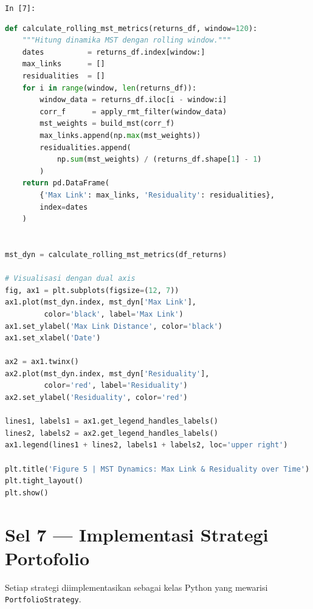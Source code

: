 \documentclass[12pt,a4paper]{article}
\newcommand{\cellIn}[1]{%
  \begin{tcolorbox}[cellheader]
    \texttt{In [#1]:}
  \end{tcolorbox}\vspace{-6pt}%
}
\begin{document}
\cellIn{7}
\begin{tcolorbox}[codebox]
\begin{lstlisting}[language=Python, numbers=none]
def calculate_rolling_mst_metrics(returns_df, window=120):
    """Hitung dinamika MST dengan rolling window."""
    dates          = returns_df.index[window:]
    max_links      = []
    residualities  = []
    for i in range(window, len(returns_df)):
        window_data = returns_df.iloc[i - window:i]
        corr_f      = apply_rmt_filter(window_data)
        mst_weights = build_mst(corr_f)
        max_links.append(np.max(mst_weights))
        residualities.append(
            np.sum(mst_weights) / (returns_df.shape[1] - 1)
        )
    return pd.DataFrame(
        {'Max Link': max_links, 'Residuality': residualities},
        index=dates
    )


mst_dyn = calculate_rolling_mst_metrics(df_returns)

# Visualisasi dengan dual axis
fig, ax1 = plt.subplots(figsize=(12, 7))
ax1.plot(mst_dyn.index, mst_dyn['Max Link'],
         color='black', label='Max Link')
ax1.set_ylabel('Max Link Distance', color='black')
ax1.set_xlabel('Date')

ax2 = ax1.twinx()
ax2.plot(mst_dyn.index, mst_dyn['Residuality'],
         color='red', label='Residuality')
ax2.set_ylabel('Residuality', color='red')

lines1, labels1 = ax1.get_legend_handles_labels()
lines2, labels2 = ax2.get_legend_handles_labels()
ax1.legend(lines1 + lines2, labels1 + labels2, loc='upper right')

plt.title('Figure 5 | MST Dynamics: Max Link & Residuality over Time')
plt.tight_layout()
plt.show()
\end{lstlisting}
\end{tcolorbox}

\section{Sel 7 --- Implementasi Strategi Portofolio}

Setiap strategi diimplementasikan sebagai kelas Python yang mewarisi
\texttt{PortfolioStrategy}.
\end{document}
